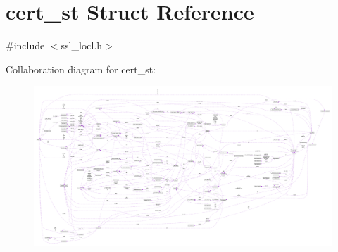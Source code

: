 \hypertarget{structcert__st}{}\section{cert\+\_\+st Struct Reference}
\label{structcert__st}


{\ttfamily \#include $<$ssl\+\_\+locl.\+h$>$}



Collaboration diagram for cert\+\_\+st\+:\nopagebreak
\begin{figure}[H]
\begin{center}
\leavevmode
\includegraphics[width=350pt]{structcert__st__coll__graph}
\end{center}
\end{figure}
